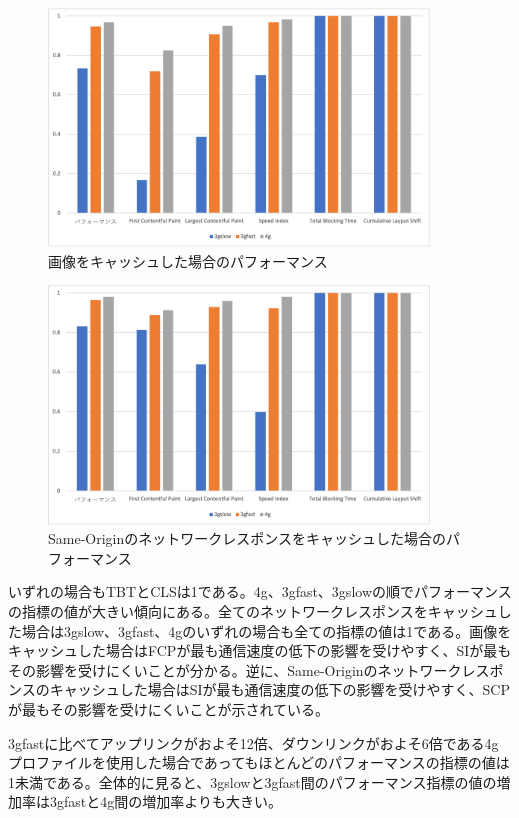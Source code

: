 \begin{figure}
  \centering
  \includegraphics[width=0.9\textwidth]{images/service_worker_cache_images.png}
  \caption{画像をキャッシュした場合のパフォーマンス}\label{figure:画像をキャッシュした場合のパフォーマンス}
\end{figure}

\begin{figure}
  \centering
  \includegraphics[width=0.9\textwidth]{images/service_worker_cache_same_origin.png}
  \caption{Same-Originのネットワークレスポンスをキャッシュした場合のパフォーマンス}\label{figure:Same-Originのネットワークレスポンスをキャッシュした場合のパフォーマンス}
\end{figure}

いずれの場合もTBTとCLSは1である。4g、3gfast、3gslowの順でパフォーマンスの指標の値が大きい傾向にある。全てのネットワークレスポンスをキャッシュした場合は3gslow、3gfast、4gのいずれの場合も全ての指標の値は1である。画像をキャッシュした場合はFCPが最も通信速度の低下の影響を受けやすく、SIが最もその影響を受けにくいことが分かる。逆に、Same-Originのネットワークレスポンスのキャッシュした場合はSIが最も通信速度の低下の影響を受けやすく、SCPが最もその影響を受けにくいことが示されている。

3gfastに比べてアップリンクがおよそ12倍、ダウンリンクがおよそ6倍である4gプロファイルを使用した場合であってもほとんどのパフォーマンスの指標の値は1未満である。全体的に見ると、3gslowと3gfast間のパフォーマンス指標の値の増加率は3gfastと4g間の増加率よりも大きい。